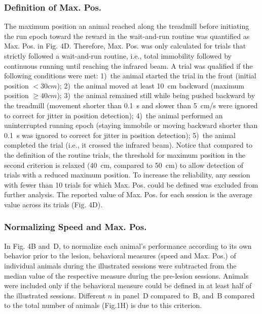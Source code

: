 \subsubsection*{Definition of Max. Pos.}
The maximum position an animal reached along the treadmill before initiating the run epoch toward the reward in the wait-and-run routine was quantified as Max. Pos. in Fig. 4D.
Therefore, Max. Pos. was only calculated for trials that strictly followed a wait-and-run routine, i.e., total immobility followed by continuous running until reaching the infrared beam.
A trial was qualified if the following conditions were met:
1)~the animal started the trial in the front (initial position $< 30 cm$);
2)~the animal moved at least 10~cm backward (maximum position $\geq 40 cm$);
3)~the animal remained still while being pushed backward by the treadmill (movement shorter than 0.1~s and slower than 5~cm/s were ignored to correct for jitter in position detection);
4)~the animal performed an uninterrupted running epoch (staying immobile or moving backward shorter than 0.1~s was ignored to correct for jitter in position detection);
5)~the animal completed the trial (i.e., it crossed the infrared beam).
Notice that compared to the definition of the routine trials, the threshold for maximum position in the second criterion is relaxed (40~cm, compared to 50~cm) to allow detection of trials with a reduced maximum position.
To increase the reliability, any session with fewer than 10 trials for which Max. Pos. could be defined was excluded from further analysis.
The reported value of Max. Pos. for each session is the average value across its trials (Fig. 4D).


\subsubsection*{Normalizing Speed and Max. Pos.}
In Fig. 4B and~D, to normalize each animal’s performance according to its own behavior prior to the lesion, behavioral measures (speed and Max. Pos.) of individual animals during the illustrated sessions were subtracted from the median value of the respective measure during the pre-lesion sessions.
Animals were included only if the behavioral measure could be defined in at least half of the illustrated sessions.
Different $n$ in panel~D compared to~B, and~B compared to the total number of animals (Fig.1H) is due to this criterion.
